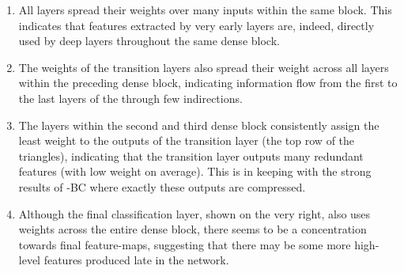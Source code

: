 \begin{enumerate}
\setlength{\itemsep}{-2.6pt}
\item All layers spread their weights over many inputs within the same block. This indicates that features extracted by very early layers are, indeed, directly used by deep layers throughout the same dense block.
\item The weights of the transition layers also spread their weight across all layers within the preceding dense block, indicating information flow from the first to the last layers of the \methodnameshort{} through few indirections.
\item The layers within the second and third dense block consistently assign the least weight to the outputs of the transition layer (the top row of the triangles), indicating that the transition layer outputs many redundant features (with low weight on average).  This is in keeping with the strong results of \methodnameshort{}-BC where exactly these outputs are compressed.
\item Although the final classification layer, shown on the very right, also uses weights across the entire dense block, there seems to be a concentration towards final feature-maps, suggesting that there may be some more high-level features produced late in the network.
\end{enumerate}
%

